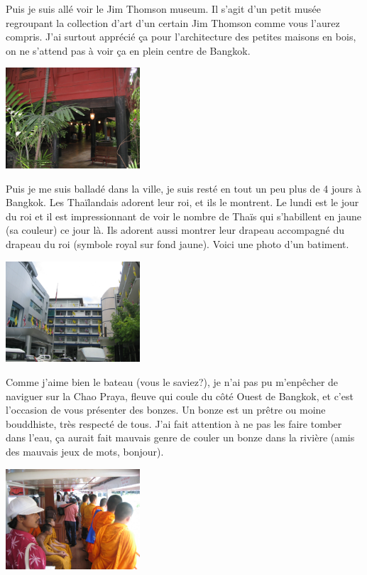 \begin{multicols}{2}
Puis je suis allé voir le Jim Thomson museum. Il s'agit d'un petit musée regroupant la collection d'art d'un certain Jim Thomson comme vous l'aurez compris. J'ai surtout apprécié ça pour l'architecture des petites maisons en bois, on ne s'attend pas à voir ça en plein centre de Bangkok.

\smallbreak
\hspace*{-0.65cm}
\includegraphics[width=5cm]{articles/Bangkok/1338.jpg}
\smallbreak

Puis je me suis balladé dans la ville, je suis resté en tout un peu plus de 4 jours à Bangkok. Les Thaïlandais adorent leur roi, et ils le montrent. Le lundi est le jour du roi et il est impressionnant de voir le nombre de Thaïs qui s'habillent en jaune (sa couleur) ce jour là. Ils adorent aussi montrer leur drapeau accompagné du drapeau du roi (symbole royal sur fond jaune). Voici une photo d'un batiment.

\smallbreak
\hspace*{-0.65cm}
\includegraphics[width=5cm]{articles/Bangkok/1395.jpg}
\smallbreak

Comme j'aime bien le bateau (vous le saviez?), je n'ai pas pu m'enpêcher de naviguer sur la Chao Praya, fleuve qui coule du côté Ouest de Bangkok, et c'est l'occasion de vous présenter des bonzes. Un bonze est un prêtre ou moine bouddhiste, très respecté de tous. J'ai fait attention à ne pas les faire tomber dans l'eau, ça aurait fait mauvais genre de couler un bonze dans la rivière (amis des mauvais jeux de mots, bonjour).

\smallbreak
\hspace*{-0.65cm}
\includegraphics[width=5cm]{articles/Bangkok/1396.jpg}
\smallbreak


\end{multicols}
